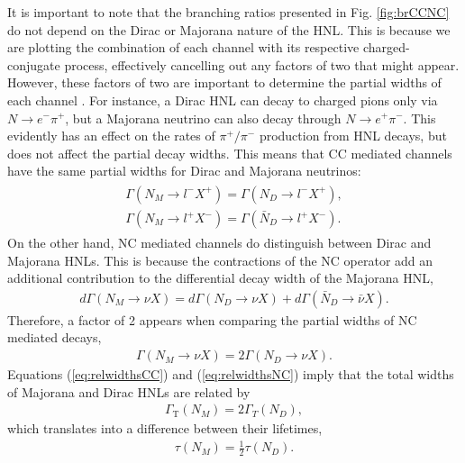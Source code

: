\documentclass[aps,prd,twocolumn,superscriptaddress,amsmath,amssymb]{revtex4}
\begin{document}
It is important to note that the branching ratios presented in Fig. \ref{fig:brCCNC} do not depend on the Dirac or Majorana nature of the HNL. This is because we are plotting the combination of each channel with its respective charged-conjugate process, effectively cancelling out any factors of two that might appear. However, these factors of two are important to determine the partial widths of each channel \cite{pascoli2019}. For instance, a Dirac HNL can decay to charged pions only via $N\to e^-\pi^+$, but a Majorana neutrino can also decay through $N\to e^+\pi^-$. This  evidently has an effect on the rates of $\pi^+/\pi^-$ production from HNL decays, but does not affect the partial decay widths. This means that CC mediated channels have the same partial widths for Dirac and Majorana neutrinos:
\begin{align}
\begin{split}
\Gamma(N_M\to l^- X^+)=\Gamma(N_D\to l^- X^+),\\
\Gamma(N_M\to l^+ X^-) = \Gamma(\bar{N}_D\to l^+ X^-).
\end{split}
\label{eq:relwidthsCC}
\end{align}
On the other hand, NC mediated channels do distinguish between Dirac and Majorana HNLs. This is because the contractions of the NC operator add an additional contribution to the differential decay width of the Majorana HNL,
\begin{align}
d\Gamma(N_M\to \nu X) = d\Gamma(N_D\to \nu X) + d\Gamma(\bar{N}_D\to \bar{\nu} X).
\end{align}
Therefore, a factor of 2 appears when comparing the partial widths of NC mediated decays,
\begin{align}
\Gamma(N_M\to \nu X) = 2\Gamma(N_D\to \nu X).
\label{eq:relwidthsNC}
\end{align}
Equations (\ref{eq:relwidthsCC}) and (\ref{eq:relwidthsNC}) imply that the total widths of Majorana and Dirac HNLs are related by
\begin{align}
\Gamma_\text{T}(N_M)=2\Gamma_T(N_D),
\end{align}
which translates into a difference between their lifetimes,
\begin{align}
\tau(N_M)=\frac{1}{2}\tau(N_D).
\end{align}
\end{document}
